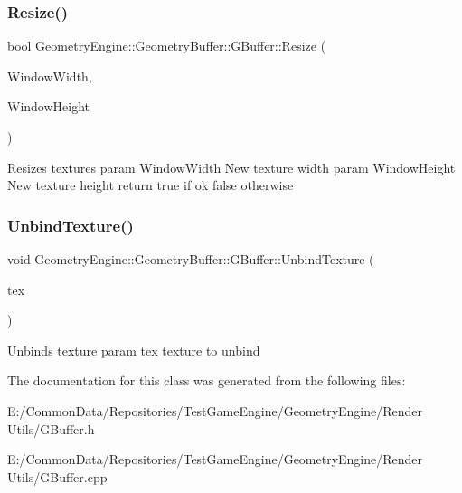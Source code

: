 \subsubsection{\texorpdfstring{Resize()}{Resize()}}
{\footnotesize\ttfamily bool Geometry\+Engine\+::\+Geometry\+Buffer\+::\+G\+Buffer\+::\+Resize (\begin{DoxyParamCaption}\item[{unsigned int}]{Window\+Width,  }\item[{unsigned int}]{Window\+Height }\end{DoxyParamCaption})}

Resizes textures param Window\+Width New texture width param Window\+Height New texture height return true if ok false otherwise \mbox{\label{class_geometry_engine_1_1_geometry_buffer_1_1_g_buffer_a15ffb63e72295abb6a10b2481fb878e4}} 
\subsubsection{\texorpdfstring{UnbindTexture()}{UnbindTexture()}}
{\footnotesize\ttfamily void Geometry\+Engine\+::\+Geometry\+Buffer\+::\+G\+Buffer\+::\+Unbind\+Texture (\begin{DoxyParamCaption}\item[{\mbox{\hyperlink{class_geometry_engine_1_1_geometry_buffer_1_1_g_buffer_a718dceafcac1915f7de061108597e1cc}{G\+B\+U\+F\+F\+E\+R\+\_\+\+T\+E\+X\+T\+U\+R\+E\+\_\+\+T\+Y\+PE}}}]{tex }\end{DoxyParamCaption})}

Unbinds texture param tex texture to unbind 

The documentation for this class was generated from the following files\+:\begin{DoxyCompactItemize}
\item 
E\+:/\+Common\+Data/\+Repositories/\+Test\+Game\+Engine/\+Geometry\+Engine/\+Render Utils/G\+Buffer.\+h\item 
E\+:/\+Common\+Data/\+Repositories/\+Test\+Game\+Engine/\+Geometry\+Engine/\+Render Utils/G\+Buffer.\+cpp\end{DoxyCompactItemize}
